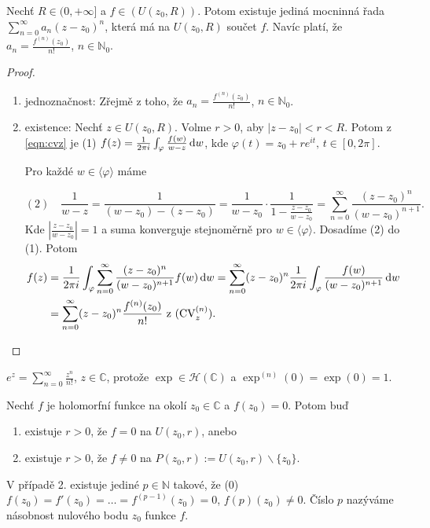 \begin{theorem}
Nechť $R \in (0, +\infty]$ a $f \in (U(z_0,R))$. Potom existuje jediná mocninná řada $\sum\limits _{n=0} ^{\infty} a_n(z-z_0)^n$, která má na $U(z_0,R)$ součet $f$. Navíc platí, že $a_n=\frac{f^{(n)}(z_0)}{n!}$, $n \in \mathbb{N}_0$.
\end{theorem}

\begin{proof}
\begin{enumerate}
    \item jednoznačnost: Zřejmě z toho, že $a_n=\frac{f^{(n)}(z_0)}{n!}$, $n \in \mathbb{N}_0$.
    \item existence: Nechť $z \in U(z_0, R)$. Volme $r>0$, aby $|z-z_0|<r<R$. Potom z \cref{eqn:cvz} je (1) $f(z)=\frac{1}{2 \pi i} \int_\varphi \frac{f(w)}{w-z} \mathop{}\!\mathrm{d} w$, kde $\varphi(t)=z_0+re^{it} \text{, } t \in [0, 2\pi]$.
    
    Pro každé $w \in \langle \varphi \rangle$ máme
    
    $$(2) \quad \frac{1}{w-z}=\frac{1}{(w-z_0)-(z-z_0)}=\frac{1}{w-z_0}\cdot\frac{1}{1-\frac{z-z_0}{w-z_0}}=\sum_{n=0}^\infty \frac{(z-z_0)^n}{(w-z_0)^{n+1}} \text{.}$$
    Kde $|\frac{z-z_0}{w-z_0}|=1$ a suma konverguje stejnoměrně pro $w \in  \langle \varphi \rangle$. Dosadíme (2) do (1). Potom
    \begin{equation*}
        \begin{split}
    f(z) &=\frac{1}{2 \pi i} \int_\varphi \sum_{n=0}^\infty \frac{(z-z_0)^n}{(w-z_0)^{n+1}} f(w) \mathop{}\!\mathrm{d} w= 
    \sum_{n=0}^\infty (z-z_0)^n \frac{1}{2 \pi i} \int_\varphi \frac{f(w)}{(w-z_0)^{n+1}} \mathop{}\!\mathrm{d} w \\
     &=\sum_{n=0}^\infty (z-z_0)^n \frac{f^{(n)}(z_0)}{n!} \text{ z (CV}_z^{(n)} \text{).}
     \end{split}
    \end{equation*}
\end{enumerate}
\end{proof}

\begin{example}
$e^z=\sum\limits_{n=0}^\infty \frac{z^n}{n!}$, $z \in \mathbb{C}$, protože $\exp \in \mathcal{H}(\mathbb{C})$ a $\exp^{(n)}(0)=\exp(0)=1$.
\end{example}

\begin{theorem}
Nechť $f$ je holomorfní funkce na okolí $z_0 \in \mathbb{C}$ a $f(z_0)=0$. Potom buď
\begin{enumerate}
    \item existuje $r>0$, že $f=0$ na $U(z_0,r)$, anebo
    \item existuje $r>0$, že $f\neq 0$ na $P(z_0,r):=U(z_0,r)\backslash \{z_0\}$.
\end{enumerate}
V případě 2. existuje jediné $p\in \mathbb{N}$ takové, že (0) $f(z_0)=f'(z_0)= \ldots = f^{(p-1)}(z_0)=0$, $f{(p)}(z_0) \neq 0$. Číslo $p$ nazýváme násobnost nulového bodu $z_0$ funkce $f$.
\end{theorem}

